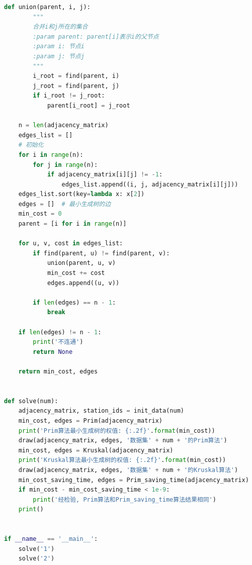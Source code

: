 \documentclass[lang=cn,11pt,a4paper]{elegantpaper}
\begin{document}
\begin{lstlisting}[language=python]
    def union(parent, i, j):
        """
        合并i和j所在的集合
        :param parent: parent[i]表示i的父节点
        :param i: 节点i
        :param j: 节点j
        """
        i_root = find(parent, i)
        j_root = find(parent, j)
        if i_root != j_root:
            parent[i_root] = j_root

    n = len(adjacency_matrix)
    edges_list = []
    # 初始化
    for i in range(n):
        for j in range(n):
            if adjacency_matrix[i][j] != -1:
                edges_list.append((i, j, adjacency_matrix[i][j]))
    edges_list.sort(key=lambda x: x[2])
    edges = []  # 最小生成树的边
    min_cost = 0
    parent = [i for i in range(n)]

    for u, v, cost in edges_list:
        if find(parent, u) != find(parent, v):
            union(parent, u, v)
            min_cost += cost
            edges.append((u, v))

        if len(edges) == n - 1:
            break

    if len(edges) != n - 1:
        print('不连通')
        return None

    return min_cost, edges


def solve(num):
    adjacency_matrix, station_ids = init_data(num)
    min_cost, edges = Prim(adjacency_matrix)
    print('Prim算法最小生成树的权值: {:.2f}'.format(min_cost))
    draw(adjacency_matrix, edges, '数据集' + num + '的Prim算法')
    min_cost, edges = Kruskal(adjacency_matrix)
    print('Kruskal算法最小生成树的权值: {:.2f}'.format(min_cost))
    draw(adjacency_matrix, edges, '数据集' + num + '的Kruskal算法')
    min_cost_saving_time, edges = Prim_saving_time(adjacency_matrix)
    if min_cost - min_cost_saving_time < 1e-9:
        print('经检验, Prim算法和Prim_saving_time算法结果相同')
    print()


if __name__ == '__main__':
    solve('1')
    solve('2')

\end{lstlisting}


\end{document}

